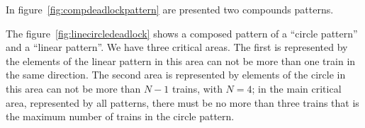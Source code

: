 \documentclass{ewic}
\begin{document}
			
			
			In figure~\ref{fig:compdeadlockpattern} are presented two compounds patterns.
			
			
			The figure~\ref{fig:linecircledeadlock}  shows a composed pattern of a ``circle pattern'' and a ``linear pattern''. We have three critical areas. The first is represented by the elements of the linear pattern in this area can not be more than one train in the same direction.  The second area is represented by elements of the circle in this area can not be more than $N-1$ trains, with $N=4$; in the main critical area, represented by all patterns,  there must be no more than three trains that is the maximum number of trains in the circle pattern.
			
\end{document}
